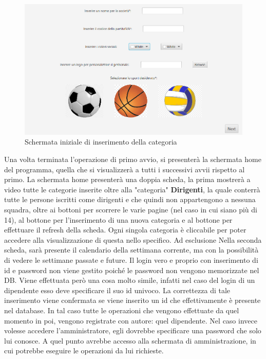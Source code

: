 \documentclass[a4paper,12pt]{report}
\begin{document}
\begin{figure}[htp]
    \centering
    \includegraphics[width = \textwidth]{GSS_report/img/schermata_iniziale.png}
    \caption{Schermata iniziale di inserimento della categoria}
    \label{fig:umlAnalisys}
\end{figure}

\newpage
Una volta terminata l'operazione di primo avvio, si presenterà la schermata home del programma, quella che si visualizzerà a tutti i successivi
avvii rispetto al primo.
La schermata home presenterà una doppia scheda, la prima mostrerà a video tutte le categorie inserite oltre alla "categoria" \textbf{Dirigenti},
la quale conterrà tutte le persone iscritti come dirigenti e che quindi non appartengono a nessuna squadra, oltre ai bottoni per scorrere le varie
pagine (nel caso in cui siano più di 14), al bottone per l'inserimento di una nuova categoria e al bottone per effettuare il refresh della scheda.
Ogni singola categoria è cliccabile per poter accedere alla visualizzazione di questa nello specifico. Ad esclusione 
Nella seconda scheda, sarà presente il calendario della settimana corrente, ma con la possibilità di vedere le settimane passate e future.
Il login vero e proprio con inserimento di id e password non viene gestito poiché le password non vengono memorizzate nel DB. 
Viene effettuata però una cosa molto simile, infatti nel caso del login di un dipendente esso deve 
specificare il suo id univoco. La correttezza di tale inserimento viene confermata se viene inserito un id che 
effettivamente è presente nel database. In tal caso tutte le operazioni che vengono effettuate da quel 
momento in poi, vengono registrate con autore: quel dipendente. Nel caso invece volesse accedere 
l’amministratore, egli dovrebbe specificare una password che solo lui conosce. A quel punto avrebbe 
accesso alla schermata di amministrazione, in cui potrebbe eseguire le operazioni da lui richieste.



\end{document}
